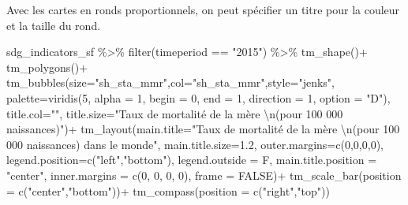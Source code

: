 \documentclass[
]{book}
\newenvironment{Shaded}{\begin{snugshade}}{\end{snugshade}}
\newcommand{\AttributeTok}[1]{\textcolor[rgb]{0.77,0.63,0.00}{#1}}
\newcommand{\ConstantTok}[1]{\textcolor[rgb]{0.00,0.00,0.00}{#1}}
\newcommand{\DecValTok}[1]{\textcolor[rgb]{0.00,0.00,0.81}{#1}}
\newcommand{\FloatTok}[1]{\textcolor[rgb]{0.00,0.00,0.81}{#1}}
\newcommand{\FunctionTok}[1]{\textcolor[rgb]{0.00,0.00,0.00}{#1}}
\newcommand{\NormalTok}[1]{#1}
\newcommand{\SpecialCharTok}[1]{\textcolor[rgb]{0.00,0.00,0.00}{#1}}
\newcommand{\StringTok}[1]{\textcolor[rgb]{0.31,0.60,0.02}{#1}}
\begin{document}
Avec les cartes en ronds proportionnels, on peut spécifier un titre pour la couleur et la taille du rond.

\begin{Shaded}
\begin{Highlighting}[]
\NormalTok{sdg\_indicators\_sf }\SpecialCharTok{\%\textgreater{}\%} 
  \FunctionTok{filter}\NormalTok{(timeperiod }\SpecialCharTok{==} \StringTok{"2015"}\NormalTok{) }\SpecialCharTok{\%\textgreater{}\%} 
  \FunctionTok{tm\_shape}\NormalTok{()}\SpecialCharTok{+}
  \FunctionTok{tm\_polygons}\NormalTok{()}\SpecialCharTok{+}
  \FunctionTok{tm\_bubbles}\NormalTok{(}\AttributeTok{size=}\StringTok{"sh\_sta\_mmr"}\NormalTok{,}\AttributeTok{col=}\StringTok{"sh\_sta\_mmr"}\NormalTok{,}\AttributeTok{style=}\StringTok{"jenks"}\NormalTok{,}
             \AttributeTok{palette=}\FunctionTok{viridis}\NormalTok{(}\DecValTok{5}\NormalTok{, }\AttributeTok{alpha =} \DecValTok{1}\NormalTok{, }\AttributeTok{begin =} \DecValTok{0}\NormalTok{, }\AttributeTok{end =} \DecValTok{1}\NormalTok{, }\AttributeTok{direction =} \DecValTok{1}\NormalTok{, }\AttributeTok{option =} \StringTok{"D"}\NormalTok{),}
              \AttributeTok{title.col=}\StringTok{""}\NormalTok{,}
              \AttributeTok{title.size=}\StringTok{"Taux de mortalité de la mère }\SpecialCharTok{\textbackslash{}n}\StringTok{(pour 100 000 naissances)"}\NormalTok{)}\SpecialCharTok{+}
  \FunctionTok{tm\_layout}\NormalTok{(}\AttributeTok{main.title=}\StringTok{"Taux de mortalité de la mère }\SpecialCharTok{\textbackslash{}n}\StringTok{(pour 100 000 naissances) dans le monde"}\NormalTok{,}
            \AttributeTok{main.title.size=}\FloatTok{1.2}\NormalTok{,}
            \AttributeTok{outer.margins=}\FunctionTok{c}\NormalTok{(}\DecValTok{0}\NormalTok{,}\DecValTok{0}\NormalTok{,}\DecValTok{0}\NormalTok{,}\DecValTok{0}\NormalTok{),}
            \AttributeTok{legend.position=}\FunctionTok{c}\NormalTok{(}\StringTok{"left"}\NormalTok{,}\StringTok{"bottom"}\NormalTok{),}
            \AttributeTok{legend.outside =}\NormalTok{ F,}
            \AttributeTok{main.title.position =} \StringTok{"center"}\NormalTok{,}
            \AttributeTok{inner.margins =} \FunctionTok{c}\NormalTok{(}\DecValTok{0}\NormalTok{, }\DecValTok{0}\NormalTok{, }\DecValTok{0}\NormalTok{, }\DecValTok{0}\NormalTok{),}
            \AttributeTok{frame =} \ConstantTok{FALSE}\NormalTok{)}\SpecialCharTok{+}
    \FunctionTok{tm\_scale\_bar}\NormalTok{(}\AttributeTok{position =} \FunctionTok{c}\NormalTok{(}\StringTok{"center"}\NormalTok{,}\StringTok{"bottom"}\NormalTok{))}\SpecialCharTok{+}
    \FunctionTok{tm\_compass}\NormalTok{(}\AttributeTok{position =} \FunctionTok{c}\NormalTok{(}\StringTok{"right"}\NormalTok{,}\StringTok{"top"}\NormalTok{))}
\end{Highlighting}
\end{Shaded}
\end{document}
